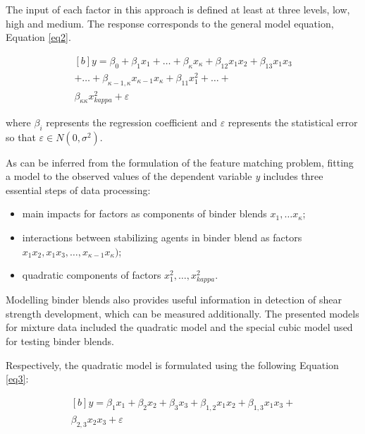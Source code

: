 \documentclass[eprint,
]{actapoly}
\begin{document}
The input of each factor in this approach is defined at least at three levels, low, high and medium. The response corresponds to the general model equation, Equation \ref{eq2}.

\begin{equation}\label{eq2}
\begin{aligned}[b]
y=\beta_0+\beta_{1}x_{1}+\ldots+\beta_{\kappa}x_{\kappa}+\beta_{12}x_{1}x_{2}+\beta_{13}x_{1}x_3\\
+\ldots+\beta_{\kappa-1,\kappa}x_{\kappa-1}x_{\kappa}+\beta_{11}x_{1}^2+\ldots+ \\\beta_{\kappa\kappa}x_{kappa}^2+\varepsilon
\end{aligned}
\end{equation}

where $\beta_i$ represents the regression coefficient and $\varepsilon$ represents the statistical error so that $\varepsilon\in N(0,\sigma^2)$.

As can be inferred from the formulation of the feature matching problem, fitting a model to the observed values of the dependent variable \emph{y} includes three essential steps of data processing: 

\begin{itemize}
	\item main impacts for factors as components of binder blends $x_1, \ldots x_\kappa$;
	\item interactions between stabilizing agents  in binder blend as factors $x_{1}x_{2}, x_{1}x_{3}, \ldots, x_{\kappa-1}x_{\kappa})$; 
	\item quadratic components of factors $x_{1}^2, \ldots, x_{kappa}^2$. 
\end{itemize}

Modelling binder blends also provides useful information in detection of shear strength development, which can be measured additionally. The presented models for mixture data included the quadratic model and the special cubic model used for testing binder blends. 

Respectively, the quadratic model is formulated using the following Equation \ref{eq3}:

\begin{equation}\label{eq3}
\begin{aligned}[b]
y=\beta_{1}x_{1}+\beta_{2}x_{2}+\beta_{3}x_{3}+\beta_{1,2}x_{1}x_{2}+\beta_{1,3}x_{1}x_{3}+\\\beta_{2,3}x_{2}x_{3}+\varepsilon
\end{aligned}
\end{equation}
\end{document}

